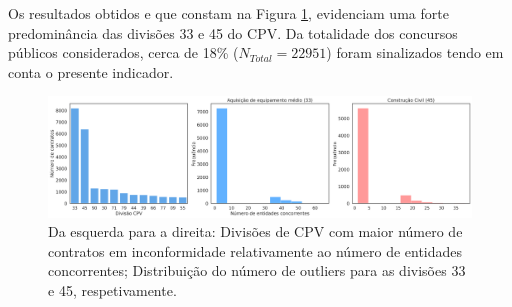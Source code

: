 Os resultados obtidos e que constam na Figura \ref{fig:necincump}, evidenciam uma forte predominância das divisões 33 e 45 do CPV. Da totalidade dos concursos públicos considerados, cerca de 18\% ($N_{Total} = 22951$)  foram sinalizados tendo em conta o presente indicador.


\begin{figure}[H]
	\centering
	\includegraphics[width=\textwidth]{imagens/r019/colecao.png}
	\caption{Da esquerda para a direita: Divisões de CPV com maior número de contratos em inconformidade relativamente ao número de entidades concorrentes; Distribuição do número de outliers para as divisões 33 e 45, respetivamente.}
	\label{fig:necincump}
\end{figure}


